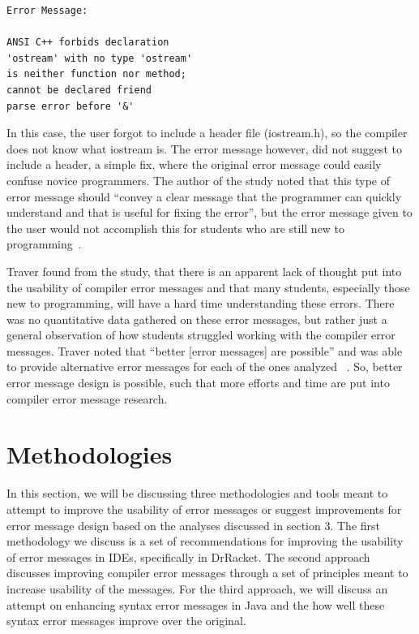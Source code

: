 \documentclass{sig-alternate}
\begin{document}
\begin{verbatim}
Error Message:

ANSI C++ forbids declaration 
'ostream' with no type 'ostream'
is neither function nor method; 
cannot be declared friend
parse error before '&'
\end{verbatim}


In this case, the user forgot to include a header file (iostream.h), so the compiler does not know what iostream is.
The error message however, did not suggest to include a header, a simple fix, where the original error message could easily confuse novice programmers.
The author of the study noted that this type of error message should ``convey a clear message that the programmer can quickly understand and that is useful for fixing the error'', but the error message given to the user would not accomplish this for students who are still new to programming~\cite{Traver:2010}.

Traver found from the study, that there is an apparent lack of thought put into the usability of compiler error messages and that many students, especially those new to programming, will have a hard time understanding these errors.
There was no quantitative data gathered on these error messages, but rather just a general observation of how students struggled working with the compiler error messages.
Traver noted that ``better [error messages] are possible'' and was able to provide alternative error messages for each of the ones analyzed ~\cite{Traver:2010}.
So, better error message design is possible, such that more efforts and time are put into compiler error message research. 

\section{Methodologies}\label{sec:methodologies}
In this section, we will be discussing three methodologies and tools meant to attempt to improve the usability of error messages or suggest improvements for error message design based on the analyses discussed in section 3.
The first methodology we discuss is a set of recommendations for improving the usability of error messages in IDEs, specifically in DrRacket.
The second approach discusses improving compiler error messages through a set of principles meant to increase usability of the messages.
For the third approach, we will discuss an attempt on enhancing syntax error messages in Java and the how well these syntax error messages improve over the original. 
\end{document}

